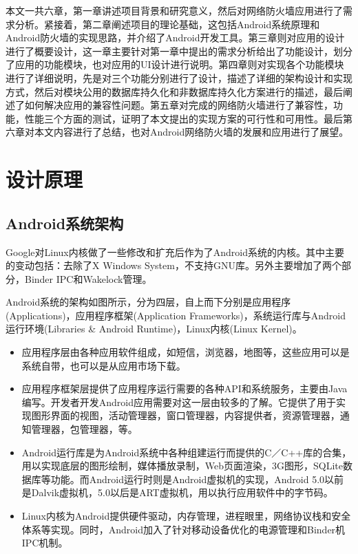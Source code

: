 \documentclass[format=final, language=chinese, degree=fyp]{hustthesis}
\begin{document}
本文一共六章，第一章讲述项目背景和研究意义，然后对网络防火墙应用进行了需求分析。紧接着，第二章阐述项目的理论基础，这包括Android系统原理和Android防火墙的实现思路，并介绍了Android开发工具。第三章则对应用的设计进行了概要设计，这一章主要针对第一章中提出的需求分析给出了功能设计，划分了应用的功能模块，也对应用的UI设计进行说明。第四章则对实现各个功能模块进行了详细说明，先是对三个功能分别进行了设计，描述了详细的架构设计和实现方式，然后对模块公用的数据库持久化和非数据库持久化方案进行的描述，最后阐述了如何解决应用的兼容性问题。第五章对完成的网络防火墙进行了兼容性，功能，性能三个方面的测试，证明了本文提出的实现方案的可行性和可用性。最后第六章对本文内容进行了总结，也对Android网络防火墙的发展和应用进行了展望。

\chapter{设计原理}\label{chapter:3}

\section{Android系统架构}

Google对Linux内核做了一些修改和扩充后作为了Android系统的内核。其中主要的变动包括：去除了X Windows System，不支持GNU库。另外主要增加了两个部分，Binder IPC和Wakelock管理。

Android系统的架构如图所示，分为四层，自上而下分别是应用程序(Applications)，应用程序框架(Application Frameworks)，系统运行库与Android运行环境(Libraries \& Android Runtime)，Linux内核(Linux Kernel)。
\begin{itemize}
	\item 应用程序层由各种应用软件组成，如短信，浏览器，地图等，这些应用可以是系统自带，也可以是从应用市场下载。
	\item 应用程序框架层提供了应用程序运行需要的各种API和系统服务，主要由Java编写。开发者开发Android应用需要对这一层由较多的了解。它提供了用于实现图形界面的视图，活动管理器，窗口管理器，内容提供者，资源管理器，通知管理器，包管理器，等。
	\item Android运行库是为Android系统中各种组建运行而提供的C／C++库的合集，用以实现底层的图形绘制，媒体播放录制，Web页面渲染，3G图形，SQLite数据库等功能。而Android运行时则是Android虚拟机的实现，Android 5.0以前是Dalvik虚拟机，5.0以后是ART虚拟机，用以执行应用软件中的字节码。
	\item Linux内核为Android提供硬件驱动，内存管理，进程眼里，网络协议栈和安全体系等实现。同时，Android加入了针对移动设备优化的电源管理和Binder机IPC机制。
\end{itemize}
\end{document}
